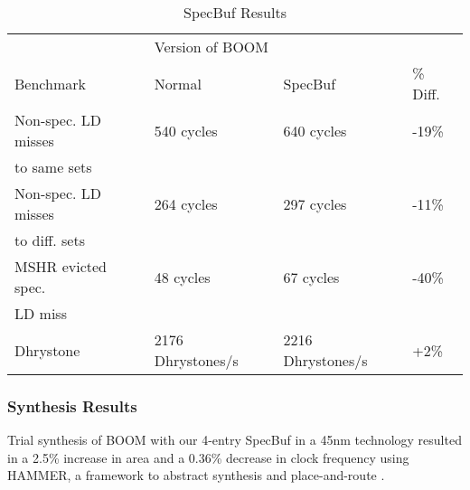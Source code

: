 \begin{table}
\centering
\caption{SpecBuf Results}
\label{tab:spec-buf-results}
\begin{tabular}{@{} *4l @{}} \toprule
    & \multicolumn{2}{l}{Version of BOOM} & \\
    Benchmark                           & Normal & SpecBuf & \% Diff.\\ \midrule
    Non-spec. LD misses   & 540 cycles & 640 cycles & -19\%    \\
    to same sets            &            &            & \\ \midrule
    Non-spec. LD misses   & 264 cycles & 297 cycles & -11\%    \\ 
    to diff. sets           &            &            & \\ \midrule
    MSHR evicted spec. & 48 cycles & 67 cycles & -40\%    \\
    LD miss                &            &            & \\ \midrule
    Dhrystone                           & 2176 Dhrystones/s & 2216 Dhrystones/s & +2\%\\ \bottomrule
\end{tabular}
\end{table}

\subsubsection{Synthesis Results} \label{Synthesis Results}
Trial synthesis of BOOM with our 4-entry SpecBuf in a 45nm technology resulted in a 2.5\% increase in area and a 0.36\% decrease in clock frequency using HAMMER, a framework to
abstract synthesis and place-and-route \cite{hammer}.


